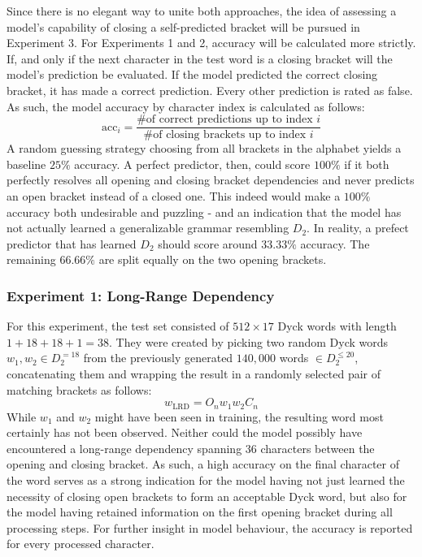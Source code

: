 Since there is no elegant way to unite both approaches, the idea of assessing a model's capability of closing a self-predicted bracket will be pursued in Experiment 3. For Experiments 1 and 2, accuracy will be calculated more strictly. If, and only if the next character in the test word is a closing bracket will the model's prediction be evaluated. If the model predicted the correct closing bracket, it has made a correct prediction. Every other prediction is rated as false. As such, the model accuracy by character index is calculated as follows:
\[
	\text{acc}_{i} = \frac{\text{\# of correct predictions up to index }i}{\text{\# of closing brackets up to index }i}
\]
A random guessing strategy choosing from all brackets in the alphabet yields a baseline $25\%$ accuracy. A perfect predictor, then, could score $100\%$ if it both perfectly resolves all opening and closing bracket dependencies and never predicts an open bracket instead of a closed one.
This indeed would make a $100\%$ accuracy both undesirable and puzzling - and an indication that the model has not actually learned a generalizable grammar resembling $D_{2}$. In reality, a prefect predictor that has learned $D_{2}$ should score around $33.33\%$ accuracy. The remaining $66.66\%$ are split equally on the two opening brackets.

\subsubsection{Experiment 1: Long-Range Dependency}\label{LRD}
For this experiment, the test set consisted of $512 \times 17$ Dyck words with length $1+18+18+1=38$. They were created by picking two random Dyck words $w_{1}, w_{2} \in D_{2}^{=18}$ from the previously generated $140,000$ words $\in D_{2}^{\leq 20}$, concatenating them and wrapping the result in a randomly selected pair of matching brackets as follows:
\[
	w_{\text{LRD}} = O_{n}w_{1}w_{2}C_{n}
\]
While $w_{1}$ and $w_{2}$ might have been seen in training, the resulting word most certainly has not been observed. Neither could the model possibly have encountered a long-range dependency spanning $36$ characters between the opening and closing bracket. As such, a high accuracy on the final character of the word serves as a strong indication for the model having not just learned the necessity of closing open brackets to form an acceptable Dyck word, but also for the model having retained information on the first opening bracket during all processing steps. For further insight in model behaviour, the accuracy is reported for every processed character.

